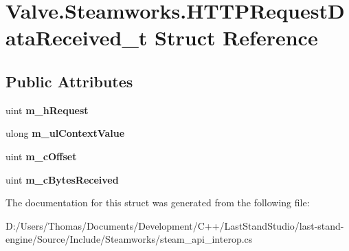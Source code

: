 \hypertarget{structValve_1_1Steamworks_1_1HTTPRequestDataReceived__t}{}\section{Valve.\+Steamworks.\+H\+T\+T\+P\+Request\+Data\+Received\+\_\+t Struct Reference}
\label{structValve_1_1Steamworks_1_1HTTPRequestDataReceived__t}
\subsection*{Public Attributes}
\begin{DoxyCompactItemize}
\item 
\hypertarget{structValve_1_1Steamworks_1_1HTTPRequestDataReceived__t_a73ad381c87b7f08bee470f0773483cc7}{}uint {\bfseries m\+\_\+h\+Request}\label{structValve_1_1Steamworks_1_1HTTPRequestDataReceived__t_a73ad381c87b7f08bee470f0773483cc7}

\item 
\hypertarget{structValve_1_1Steamworks_1_1HTTPRequestDataReceived__t_a847a821e18218f62ddfa99d65f88e39d}{}ulong {\bfseries m\+\_\+ul\+Context\+Value}\label{structValve_1_1Steamworks_1_1HTTPRequestDataReceived__t_a847a821e18218f62ddfa99d65f88e39d}

\item 
\hypertarget{structValve_1_1Steamworks_1_1HTTPRequestDataReceived__t_a2a2f677e3ef93082c7685f3480cdd734}{}uint {\bfseries m\+\_\+c\+Offset}\label{structValve_1_1Steamworks_1_1HTTPRequestDataReceived__t_a2a2f677e3ef93082c7685f3480cdd734}

\item 
\hypertarget{structValve_1_1Steamworks_1_1HTTPRequestDataReceived__t_ac070e79448672f6cd52ed67748e5c748}{}uint {\bfseries m\+\_\+c\+Bytes\+Received}\label{structValve_1_1Steamworks_1_1HTTPRequestDataReceived__t_ac070e79448672f6cd52ed67748e5c748}

\end{DoxyCompactItemize}


The documentation for this struct was generated from the following file\+:\begin{DoxyCompactItemize}
\item 
D\+:/\+Users/\+Thomas/\+Documents/\+Development/\+C++/\+Last\+Stand\+Studio/last-\/stand-\/engine/\+Source/\+Include/\+Steamworks/steam\+\_\+api\+\_\+interop.\+cs\end{DoxyCompactItemize}

